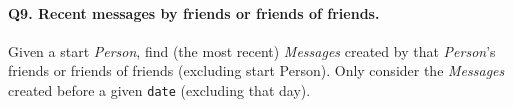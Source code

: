 \paragraph{\textbf{Q9}. Recent messages by friends or friends of friends.}
Given a start \emph{Person}, find (the most recent) \emph{Messages}
created by that \emph{Person}'s friends or friends of friends (excluding
start Person). Only consider the \emph{Messages} created before a given
\texttt{date} (excluding that day).
